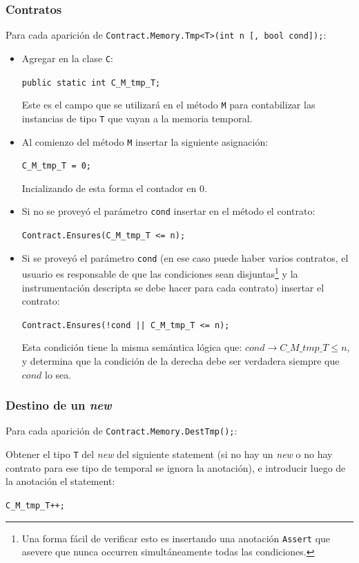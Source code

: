 \documentclass[12pt,a4paper]{article}
\newcommand\mono[1]{\texttt{#1}}
\begin{document}
			\subsubsection{Contratos}
				Para cada aparición de \mono{Contract.Memory.Tmp<T>(int n [, bool cond]);}:
				\begin{itemize}
					\item
						Agregar en la clase \mono{C}:

						\mono{public static int C\_M\_tmp\_T;}

						Este es el campo que se utilizará en el método \mono{M} para contabilizar las instancias de tipo \mono{T} que vayan a la memoria temporal.
					\item
						Al comienzo del método \mono{M} insertar la siguiente asignación:

						\mono{C\_M\_tmp\_T = 0;}

						Incializando de esta forma el contador en 0.
					\item
						Si no se proveyó el parámetro \mono{cond} insertar en el método el contrato:

						\mono{Contract.Ensures(C\_M\_tmp\_T <= n);}
					\item
						Si se proveyó el parámetro \mono{cond} (en ese caso puede haber varios contratos, el usuario es responsable de que las condiciones sean disjuntas\footnote{Una forma fácil de verificar esto es insertando una anotación \mono{Assert} que asevere que nunca occurren simultáneamente todas las condiciones.} y la instrumentación descripta se debe hacer para cada contrato) insertar el contrato:

						\mono{Contract.Ensures(!cond || C\_M\_tmp\_T <= n);}

						Esta condición tiene la misma semántica lógica que: $cond \rightarrow C\_M\_tmp\_T \leq n$, y determina que la condición de la derecha debe ser verdadera siempre que $cond$ lo sea.
				\end{itemize}
			\subsubsection{Destino de un \textit{new}}
				Para cada aparición de \mono{Contract.Memory.DestTmp();}:

				Obtener el tipo \mono{T} del \textit{new} del siguiente statement (si no hay un \textit{new} o no hay contrato para ese tipo de temporal se ignora la anotación), e introducir luego de la anotación el statement:

				\mono{C\_M\_tmp\_T++;}
\end{document}
